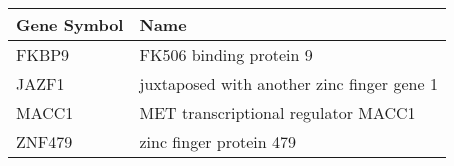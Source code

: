 \begin{tabular}{ll}
\toprule
Gene Symbol &                                       Name \\
\midrule
      FKBP9 &                    FK506 binding protein 9 \\
      JAZF1 & juxtaposed with another zinc finger gene 1 \\
      MACC1 &        MET transcriptional regulator MACC1 \\
     ZNF479 &                    zinc finger protein 479 \\
\bottomrule
\end{tabular}
